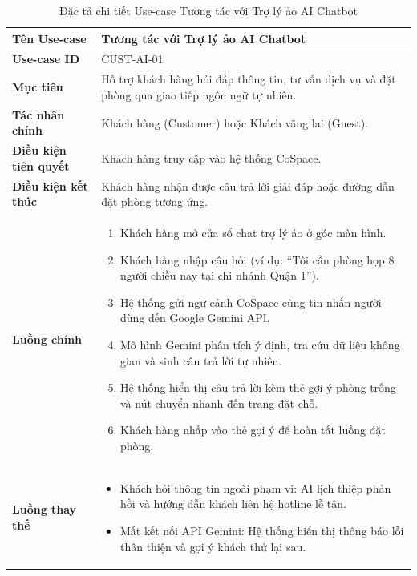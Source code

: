 
\begin{table}[H]
\centering
\renewcommand{\arraystretch}{1.3}
\begin{tabular}{|p{4cm}|p{10cm}|}
\hline
\textbf{Tên Use-case} & Tương tác với Trợ lý ảo AI Chatbot \\
\hline
\textbf{Use-case ID} & CUST-AI-01 \\
\hline
\textbf{Mục tiêu} & Hỗ trợ khách hàng hỏi đáp thông tin, tư vấn dịch vụ và đặt phòng qua giao tiếp ngôn ngữ tự nhiên. \\
\hline
\textbf{Tác nhân chính} & Khách hàng (Customer) hoặc Khách vãng lai (Guest). \\
\hline
\textbf{Điều kiện tiên quyết} & Khách hàng truy cập vào hệ thống CoSpace. \\
\hline
\textbf{Điều kiện kết thúc} & Khách hàng nhận được câu trả lời giải đáp hoặc đường dẫn đặt phòng tương ứng. \\
\hline
\textbf{Luồng chính} & 
\begin{enumerate}
    \item Khách hàng mở cửa sổ chat trợ lý ảo ở góc màn hình.
    \item Khách hàng nhập câu hỏi (ví dụ: ``Tôi cần phòng họp 8 người chiều nay tại chi nhánh Quận 1'').
    \item Hệ thống gửi ngữ cảnh CoSpace cùng tin nhắn người dùng đến Google Gemini API.
    \item Mô hình Gemini phân tích ý định, tra cứu dữ liệu không gian và sinh câu trả lời tự nhiên.
    \item Hệ thống hiển thị câu trả lời kèm thẻ gợi ý phòng trống và nút chuyển nhanh đến trang đặt chỗ.
    \item Khách hàng nhấp vào thẻ gợi ý để hoàn tất luồng đặt phòng.
\end{enumerate} \\
\hline
\textbf{Luồng thay thế} & 
\begin{itemize}
    \item Khách hỏi thông tin ngoài phạm vi: AI lịch thiệp phản hồi và hướng dẫn khách liên hệ hotline lễ tân.
    \item Mất kết nối API Gemini: Hệ thống hiển thị thông báo lỗi thân thiện và gợi ý khách thử lại sau.
\end{itemize} \\
\hline
\end{tabular}
\caption{Đặc tả chi tiết Use-case Tương tác với Trợ lý ảo AI Chatbot}
\label{tab:uc-chatbot}
\end{table}

